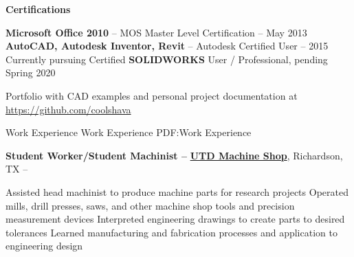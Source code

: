 \documentclass[letterpaper,MMMyyyy,nonstopmode]{simpleresumecv}
\begin{document}
\begin{Body}
\textbf{Certifications}
\begin{Detail}
\SubBulletItem
\textbf{Microsoft Office 2010} -- MOS Master Level Certification -- May 2013
\SubBulletItem
\textbf{AutoCAD, Autodesk Inventor, Revit} -- Autodesk Certified User -- 2015
\SubBulletItem
Currently pursuing Certified \textbf{SOLIDWORKS} User / Professional, pending Spring 2020
\end{Detail}
Portfolio with CAD examples and personal project documentation at \href{https://github.com/coolshava}{https://github.com/coolshava} 

\Section
{Work\newline
Experience}
{Work Experience}
{PDF:Work Experience}

\Entry
\textbf{Student Worker/Student Machinist --} \href{https://www.utdallas.edu/machineshop/}
{\textbf{UTD Machine Shop}},
Richardson, TX
\hfill
{} -- 
\SmallGap
\begin{Detail}
\SubBulletItem
Assisted head machinist to produce machine parts for research projects
\SubBulletItem
Operated mills, drill presses, saws, and other machine shop tools and precision measurement devices
\SubBulletItem
Interpreted engineering drawings to create parts to desired tolerances
\SubBulletItem
Learned manufacturing and fabrication processes and application to engineering design
\end{Detail}



\end{Body}
\end{document}
